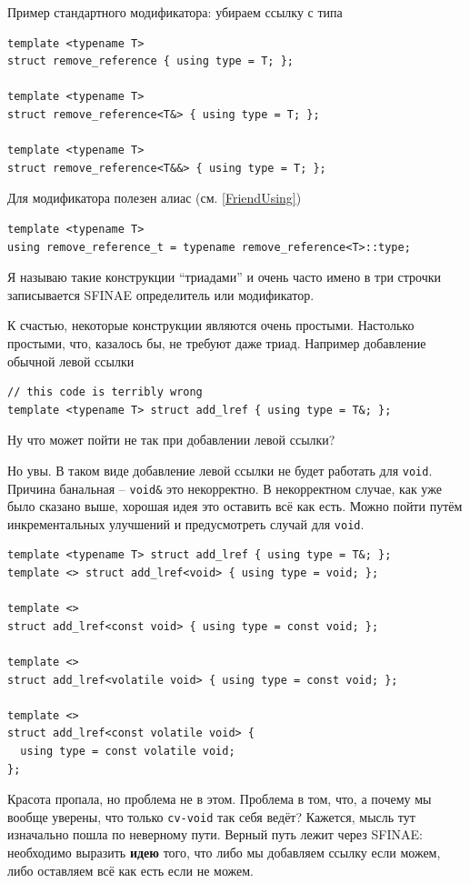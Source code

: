 \documentclass[a4paper,12pt,oneside]{article}
\begin{document}
Пример стандартного модификатора: убираем ссылку с типа

\begin{lstlisting}
template <typename T> 
struct remove_reference { using type = T; };

template <typename T> 
struct remove_reference<T&> { using type = T; };

template <typename T> 
struct remove_reference<T&&> { using type = T; };
\end{lstlisting}

Для модификатора полезен алиас (см. \ref{FriendUsing})

\begin{lstlisting}
template <typename T> 
using remove_reference_t = typename remove_reference<T>::type;
\end{lstlisting}

Я называю такие конструкции ``триадами'' и очень часто имено в три строчки записывается SFINAE определитель или модификатор.

К счастью, некоторые конструкции являются очень простыми. Настолько простыми, что, казалось бы, не требуют даже триад. Например добавление обычной левой ссылки

\begin{lstlisting}
// this code is terribly wrong
template <typename T> struct add_lref { using type = T&; };
\end{lstlisting}

Ну что может пойти не так при добавлении левой ссылки?

Но увы. В таком виде добавление левой ссылки не будет работать для \lstinline!void!. Причина банальная -- \lstinline!void&! это некорректно. В некорректном случае, как уже было сказано выше, хорошая идея это оставить всё как есть. Можно пойти путём инкрементальных улучшений и предусмотреть случай для \lstinline!void!.

\begin{lstlisting}
template <typename T> struct add_lref { using type = T&; };
template <> struct add_lref<void> { using type = void; };

template <> 
struct add_lref<const void> { using type = const void; };

template <> 
struct add_lref<volatile void> { using type = const void; };

template <> 
struct add_lref<const volatile void> { 
  using type = const volatile void; 
};
\end{lstlisting}

Красота пропала, но проблема не в этом. Проблема в том, что, а почему мы вообще уверены, что только \lstinline!cv-void! так себя ведёт? Кажется, мысль тут изначально пошла по неверному пути. Верный путь лежит через SFINAE: необходимо выразить \textbf{идею} того, что либо мы добавляем ссылку если можем, либо оставляем всё как есть если не можем.
\end{document}
